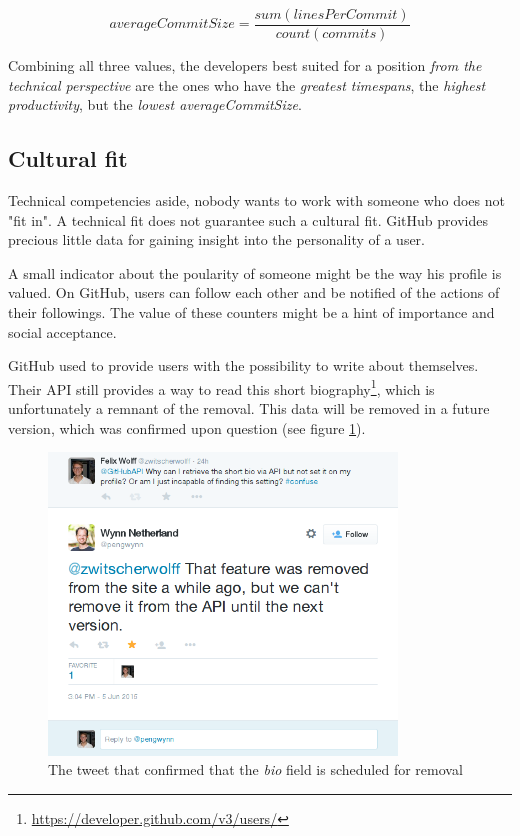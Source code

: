 \begin{equation}
averageCommitSize = \frac{sum(linesPerCommit)}{count(commits)}
\label {eq:avgcommitsize}
\end{equation}

Combining all three values, the developers best suited for a position
\textit{from the technical perspective} are the ones who
have the \textit{greatest timespans}, the \textit{highest productivity},
but the \textit{lowest averageCommitSize}.

\subsection{Cultural fit}
Technical competencies aside, nobody wants to work with someone who does
not "fit in". A technical fit does not guarantee such a cultural fit.
GitHub provides precious little data for gaining insight into the
personality of a user.
\newline

A small indicator about the poularity of someone might be the way
his profile is valued. On GitHub, users can follow each other and be
notified of the actions of their followings. The value of these counters
might be a hint of importance and social acceptance.
\newline

GitHub used to provide users with the possibility to write about themselves.
Their API still provides a way to read this short biography\footnote{\url{https://developer.github.com/v3/users/}}, which is unfortunately a
remnant of the removal. This data will be removed in a future version,
which was confirmed upon question (see figure \ref{fig:gapitweet}).

\begin{figure}
  \centering
  \includegraphics[width=25em]{gfx/githubapi_tweet.png}
  \caption{The tweet that confirmed that the \textit{bio} field is scheduled for removal}
  \label{fig:gapitweet}
\end{figure}

